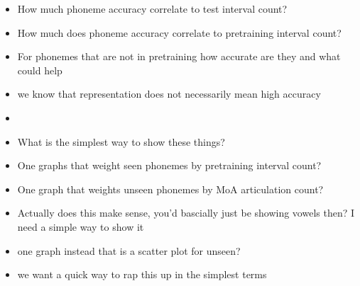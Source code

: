 \begin{itemize}
\begin{itemize}
        \item How much phoneme accuracy correlate to test interval count?
        \item How much does phoneme accuracy correlate to pretraining interval count?
        \item For phonemes that are not in pretraining how accurate are they and what could help
        \item we know that representation does not necessarily mean high accuracy
        \item 
        \item What is the simplest way to show these things?
        \item One graphs that weight seen phonemes by pretraining interval count?
        \item One graph that weights unseen phonemes by MoA articulation count?
        \item Actually does this make sense, you'd bascially just be showing vowels then? I need a simple way to show it
        \item one graph instead that is a scatter plot for unseen?
        \item we want a quick way to rap this up in the simplest terms
        

\end{itemize}
\end{itemize}
